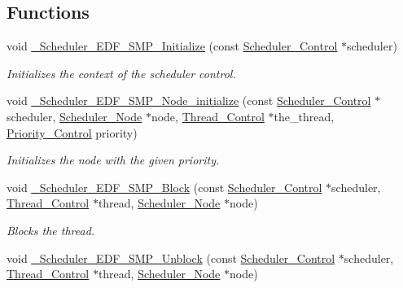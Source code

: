 \subsection*{Functions}
\begin{DoxyCompactItemize}
\item 
void \mbox{\hyperlink{group__RTEMSScoreSchedulerSMPEDF_ga3cacc8a26939504046f7ace2d7d3b9fe}{\+\_\+\+Scheduler\+\_\+\+E\+D\+F\+\_\+\+S\+M\+P\+\_\+\+Initialize}} (const \mbox{\hyperlink{struct__Scheduler__Control}{Scheduler\+\_\+\+Control}} $\ast$scheduler)
\begin{DoxyCompactList}\small\item\em Initializes the context of the scheduler control. \end{DoxyCompactList}\item 
void \mbox{\hyperlink{group__RTEMSScoreSchedulerSMPEDF_ga240d0512b97a945b35eaa72b0191a2c4}{\+\_\+\+Scheduler\+\_\+\+E\+D\+F\+\_\+\+S\+M\+P\+\_\+\+Node\+\_\+initialize}} (const \mbox{\hyperlink{struct__Scheduler__Control}{Scheduler\+\_\+\+Control}} $\ast$scheduler, \mbox{\hyperlink{structScheduler__Node}{Scheduler\+\_\+\+Node}} $\ast$node, \mbox{\hyperlink{struct__Thread__Control}{Thread\+\_\+\+Control}} $\ast$the\+\_\+thread, \mbox{\hyperlink{group__RTEMSScorePriority_ga59d02b58072d31a9a1cfe644557aefe2}{Priority\+\_\+\+Control}} priority)
\begin{DoxyCompactList}\small\item\em Initializes the node with the given priority. \end{DoxyCompactList}\item 
void \mbox{\hyperlink{group__RTEMSScoreSchedulerSMPEDF_ga9aec88f72c2f1a2bc05f2163f1529802}{\+\_\+\+Scheduler\+\_\+\+E\+D\+F\+\_\+\+S\+M\+P\+\_\+\+Block}} (const \mbox{\hyperlink{struct__Scheduler__Control}{Scheduler\+\_\+\+Control}} $\ast$scheduler, \mbox{\hyperlink{struct__Thread__Control}{Thread\+\_\+\+Control}} $\ast$thread, \mbox{\hyperlink{structScheduler__Node}{Scheduler\+\_\+\+Node}} $\ast$node)
\begin{DoxyCompactList}\small\item\em Blocks the thread. \end{DoxyCompactList}\item 
void \mbox{\hyperlink{group__RTEMSScoreSchedulerSMPEDF_ga3425b28e4a2bf41c91d9d512eb5dffda}{\+\_\+\+Scheduler\+\_\+\+E\+D\+F\+\_\+\+S\+M\+P\+\_\+\+Unblock}} (const \mbox{\hyperlink{struct__Scheduler__Control}{Scheduler\+\_\+\+Control}} $\ast$scheduler, \mbox{\hyperlink{struct__Thread__Control}{Thread\+\_\+\+Control}} $\ast$thread, \mbox{\hyperlink{structScheduler__Node}{Scheduler\+\_\+\+Node}} $\ast$node)

\end{DoxyCompactItemize}
